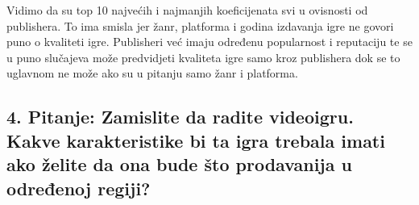 \documentclass[
]{article}
\begin{document}
Vidimo da su top 10 najvećih i najmanjih koeficijenata svi u ovisnosti
od publishera. To ima smisla jer žanr, platforma i godina izdavanja igre
ne govori puno o kvaliteti igre. Publisheri već imaju određenu
popularnost i reputaciju te se u puno slučajeva može predvidjeti
kvaliteta igre samo kroz publishera dok se to uglavnom ne može ako su u
pitanju samo žanr i platforma.

\hypertarget{pitanje-zamislite-da-radite-videoigru.-kakve-karakteristike-bi-ta-igra-trebala-imati-ako-ux17eelite-da-ona-bude-ux161to-prodavanija-u-odreux111enoj-regiji}{%
\subsection{4. Pitanje: Zamislite da radite videoigru. Kakve
karakteristike bi ta igra trebala imati ako želite da ona bude što
prodavanija u određenoj
regiji?}\label{pitanje-zamislite-da-radite-videoigru.-kakve-karakteristike-bi-ta-igra-trebala-imati-ako-ux17eelite-da-ona-bude-ux161to-prodavanija-u-odreux111enoj-regiji}}
\end{document}
